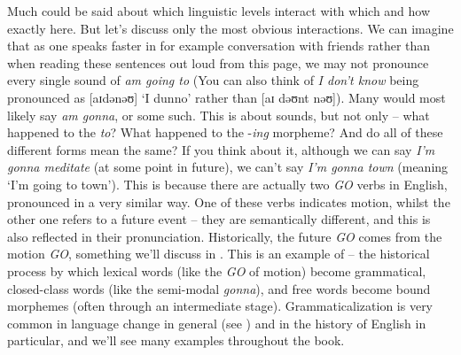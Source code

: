 \noindent Much could be said about which linguistic levels interact with which and how exactly here. But let's discuss only the most obvious interactions. We can imagine that as one speaks faster in for example conversation with friends rather than when reading these sentences out loud from this page, we may not pronounce every single sound of \textit{am going to} (You can also think of \textit{I don't know} being pronounced as [aɪdənəʊ] `I dunno' rather than [aɪ dəʊnt nəʊ]). Many would most likely say \textit{am gonna}, or some such. This is about sounds, but not only -- what happened to the \emph{to}? What happened to the -\emph{ing} morpheme? And do all of these different forms mean the same? If you think about it, although we can say \emph{I'm gonna meditate} (at some point in future), we can't say \emph{I'm gonna town} (meaning `I'm going to town'). This is because there are actually two \emph{GO} verbs in English, pronounced in a very similar way. One of these verbs indicates motion, whilst the other one refers to a future event -- they are semantically different, and this is also reflected in their pronunciation. Historically, the future \emph{GO} comes from the motion \emph{GO}, something we'll discuss in . This is an example of  -- the historical process by which lexical words (like the \emph{GO} of motion) become grammatical, closed-class words (like the semi-modal \emph{gonna}), and free words become bound morphemes (often through an intermediate  stage). Grammaticalization is very common in language change in general (see \citealp{HopperTraugott2003}) and in the history of English in particular, and we'll see many examples throughout the book.

